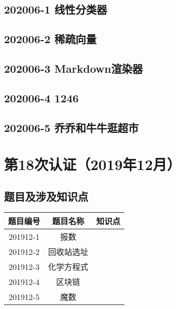\documentclass[cn,10pt,math=newtx,citestyle=gb7714-2015,bibstyle=gb7714-2015]{elegantbook}
\newif\ifonlyanalyze %
\begin{document}
\newpage
\section{202006-1 线性分类器}
\ifonlyanalyze
\else
    
\fi


\newpage
\section{202006-2 稀疏向量}
\ifonlyanalyze
\else
    
\fi


\newpage
\section{202006-3 Markdown渲染器}
\ifonlyanalyze
\else
    
\fi


\newpage
\section{202006-4 1246}
\ifonlyanalyze
\else
    
\fi


\newpage
\section{202006-5 乔乔和牛牛逛超市}
\ifonlyanalyze
\else
    
\fi



\chapter{第18次认证（2019年12月）}

\section{题目及涉及知识点}

\begin{table}[htbp]
    \centering
    \begin{tabular}{ccc}
        \toprule
        题目编号 & 题目名称   & 知识点 \\
        \midrule
        201912-1 & 报数       &        \\
        201912-2 & 回收站选址 &        \\
        201912-3 & 化学方程式 &        \\
        201912-4 & 区块链     &        \\
        201912-5 & 魔数       &        \\
        \bottomrule
    \end{tabular}
\end{table}
\end{document}
